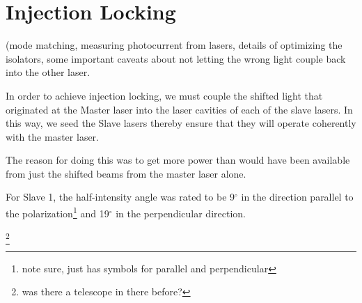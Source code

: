  \chapter{Injection Locking}
 (mode matching, measuring photocurrent from lasers, details of optimizing the isolators, some important caveats about not letting the wrong light couple back into the other laser. 

In order to achieve injection locking, we must couple the shifted light that originated at the Master laser into the laser cavities of each of the slave lasers. In this way, we seed the Slave lasers thereby ensure that they will operate coherently with the master laser. 

The reason for doing this was to get more power than would have been available from just the shifted beams from the master laser alone. 

For Slave 1, the half-intensity angle was rated to be 9$^\circ$ in the direction parallel to the polarization\footnote{note sure, just has symbols for parallel and perpendicular} and 19$^\circ$ in the perpendicular direction. 

\footnote{was there a telescope in there before? }

